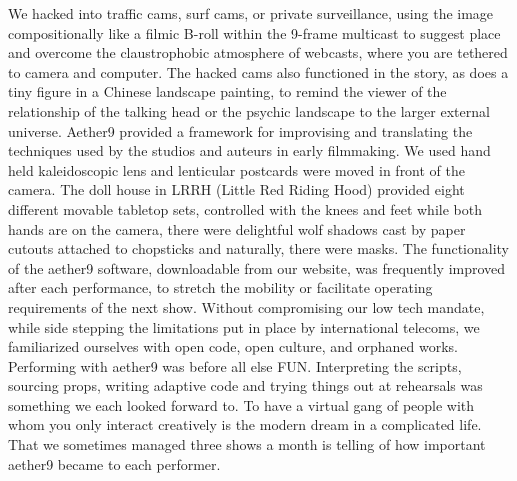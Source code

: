 We hacked into traffic cams, surf cams, or private surveillance, using the image compositionally like a filmic B-roll within the 9-frame multicast to suggest place and overcome the claustrophobic atmosphere of webcasts, where you are tethered to camera and computer. The hacked cams also functioned in the story, as does a tiny figure in a Chinese landscape painting, to remind the viewer of the relationship of the talking head or the psychic landscape to the larger external universe. Aether9 provided a framework for improvising and translating the techniques used by the studios and auteurs in early filmmaking. We used hand held kaleidoscopic lens and lenticular postcards were moved in front of the camera. The doll house in LRRH (Little Red Riding Hood) provided eight different movable tabletop sets, controlled with the knees and feet while both hands are on the camera, there were delightful wolf shadows cast by paper cutouts attached to chopsticks and naturally, there were masks. The functionality of the aether9 software, downloadable from our website, was frequently improved after each performance, to stretch the mobility or facilitate operating requirements of the next show. Without compromising our low tech mandate, while side stepping the limitations put in place by international telecoms, we familiarized ourselves with open code, open culture, and orphaned works. Performing with aether9 was before all else FUN. Interpreting the scripts, sourcing props, writing adaptive code and trying things out at rehearsals was something we each looked forward to. To have a virtual gang of people with whom you only interact creatively is the modern dream in a complicated life. That we sometimes managed three shows a month is telling of how important aether9 became to each performer.
 
